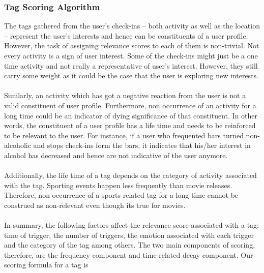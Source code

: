 \documentclass[12pt,letterpaper]{article}
\begin{document}
\subsubsection{Tag Scoring Algorithm}
The tags gathered from the user's check-ins -- both activity as well as the location -- represent the user's interests and hence can be constituents of a user profile. However, the task of assigning relevance scores to each of them is non-trivial.  Not every activity is a sign of user interest. Some of the check-ins might just be a one time activity and not really a representative of user's interest. However, they still carry some weight as it could be the case that the user is exploring new interests. 
\\\\
Similarly, an activity which has got a negative reaction from the user is not a valid constituent of user profile. Furthermore, non occurrence of an activity for a long time could be an indicator of dying significance of that constituent. In other words, the constituent of a user profile has a life time and needs to be reinforced to be relevant to the user. For instance, if a user who frequented bars turned non-alcoholic and stops check-ins form the bars, it indicates that his/her interest in alcohol has decreased and hence are not indicative of the user anymore. 
\\\\
Additionally, the life time of a tag depends on the category of activity associated with the tag. Sporting events happen less frequently than movie releases. Therefore, non occurrence of a sports related tag for a long time cannot be construed as non-relevant even though its true for movies.
\\\\
In summary, the following factors affect the relevance score associated with a tag: time of trigger, the number of triggers, the emotion associated with each trigger and the category of the tag among others. The two main components of scoring, therefore, are the frequency component and time-related decay component. Our scoring formula for a tag is
\end{document}

